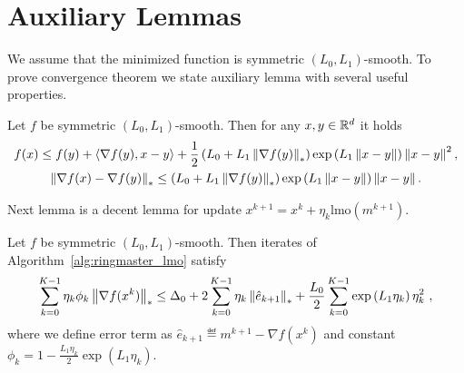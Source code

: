 \documentclass{article}
\begin{document}
{
\small


}
\newpage
\appendix

\section{Auxiliary Lemmas}
% 
We assume that the minimized function is symmetric $(L_0,L_1)$-smooth. To prove convergence theorem we state auxiliary lemma with several useful properties. 
\begin{lemma}
    \label{lem:gen_smooth}
    Let $f$ be symmetric $(L_0, L_1)$-smooth. Then for any $x,y\in \mathbb{R}^d$ it holds 
    \begin{gather*}
        f(x) \le f(y) + \left\langle\nabla f(y),x-y\right\rangle +\frac{1}{2}\left(L_0 + L_1\left\| \nabla f(y) \right\|_*\right)\exp\left(L_1\left\| x-y \right\|\right)\left\| x-y \right\|^2, \\
        \left\| \nabla f(x) - \nabla f(y) \right\|_* \le \left(L_0 + L_1\left\| \nabla f(y) \right\|_*\right)\exp\left(L_1\left\| x-y \right\|\right)\left\| x-y \right\| .
    \end{gather*}
\end{lemma}
Next lemma is a decent lemma for update  $x^{k+1} = x^{k} + \eta_k\textrm{lmo}(m^{k+1})$. 
\begin{lemma}
    \label{lem:descent_lemma}
    Let $f$ be symmetric $(L_0, L_1)$-smooth. Then iterates of Algorithm~\ref{alg:ringmaster_lmo} satisfy 
    \begin{equation}
        \sum_{k=0}^{K-1}\eta_k\phi_k\left\| \nabla f(x^k) \right\|_* \leq \Delta_0 + 2\sum^{K-1}_{k=0}\eta_k\left\| \hat{e}_{k+1} \right\|_* +\frac{L_0}{2}\sum^{K-1}_{k=0}\exp\left(L_1\eta_k\right)\eta_k^2 ~,
    \end{equation}
    where we define error term as $\hat{e}_{k+1} \eqdef m^{k+1} - \nabla f(x^k)$ and constant $\phi_k  = 1-\frac{L_1\eta_k}{2}\exp(L_1\eta_k)$. 
\end{lemma}
\end{document}
